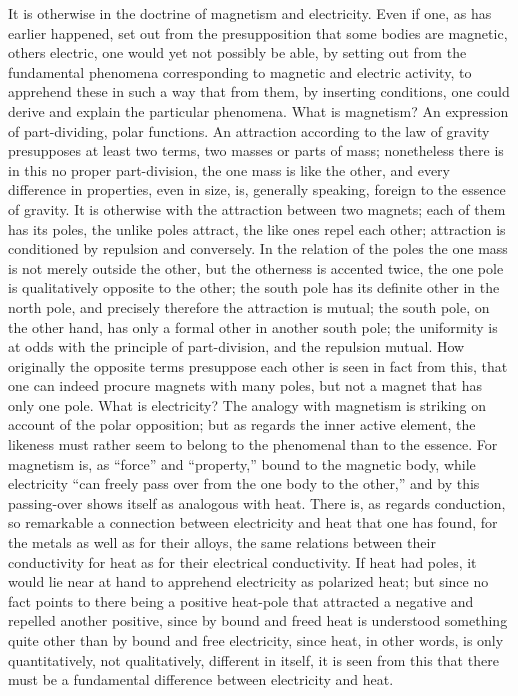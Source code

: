 \documentclass[12pt]{book}
\begin{document}
It is otherwise in the doctrine of magnetism and electricity. Even if one, as has
earlier happened, set out from the presupposition that some bodies are magnetic, others
electric, one would yet not possibly be able, by setting out from the fundamental
phenomena corresponding to magnetic and electric activity, to apprehend these in such a
way that from them, by inserting conditions, one could derive and explain the particular
phenomena. What is magnetism? An expression of part-dividing, polar functions. An
attraction according to the law of gravity presupposes at least two terms, two masses or
parts of mass; nonetheless there is in this no proper part-division, the one mass is
like the other, and every difference in properties, even in size, is, generally
speaking, foreign to the essence of gravity. It is otherwise with the attraction between
two magnets; each of them has its poles, the unlike poles attract, the like ones repel
each other; attraction is conditioned by repulsion and conversely. In the relation of
the poles the one mass is not merely outside the other, but the otherness is accented
twice, the one pole is qualitatively opposite to the other; the south pole has its
definite other in the north pole, and precisely therefore the attraction is mutual; the
south pole, on the other hand, has only a formal other in another south pole; the
uniformity is at odds with the principle of part-division, and the repulsion mutual. How
originally the opposite terms presuppose each other is seen in fact from this, that one
can indeed procure magnets with many poles, but not a magnet that has only one pole.
What is electricity? The analogy with magnetism is striking on account of the polar
opposition; but as regards the inner active element, the likeness must rather seem to
belong to the phenomenal than to the essence. For magnetism is, as ``force'' and
``property,'' bound to the magnetic body, while electricity ``can freely pass over from
the one body to the other,'' and by this passing-over shows itself as analogous with
heat. There is, as regards conduction, so remarkable a connection between electricity
and heat that one has found, for the metals as well as for their alloys, the same
relations between their conductivity for heat as for their electrical conductivity. If
heat had poles, it would lie near at hand to apprehend electricity as polarized heat;
but since no fact points to there being a positive heat-pole that attracted a negative
and repelled another positive, since by bound and freed heat is understood something
quite other than by bound and free electricity, since heat, in other words, is only
quantitatively, not qualitatively, different in itself, it is seen from this that there
must be a fundamental difference between electricity and heat.
\end{document}
